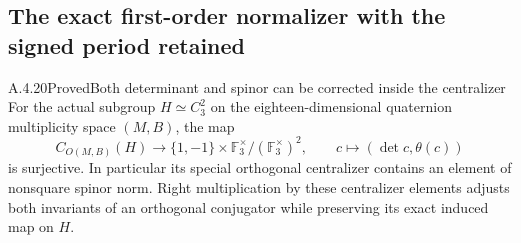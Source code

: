 \subsection{The exact first-order normalizer with the signed period retained}

\begin{result}{A.4.20}{Proved}{Both determinant and spinor can be corrected inside the centralizer}
\label{lem:orthogonal-centralizer-spinor}
For the actual subgroup \(H\simeq C_3^2\) on the eighteen-dimensional
quaternion multiplicity space \((M,B)\), the map
\[
 C_{O(M,B)}(H)\longrightarrow
 \{1,-1\}\times\mathbb F_3^\times/(\mathbb F_3^\times)^2,
 \qquad c\longmapsto(\det c,\theta(c))
 \tag{NJ.1}
\]
is surjective. In particular its special orthogonal centralizer contains
an element of nonsquare spinor norm. Right multiplication by these
centralizer elements adjusts both invariants of an orthogonal conjugator
while preserving its exact induced map on \(H\).
\end{result}
